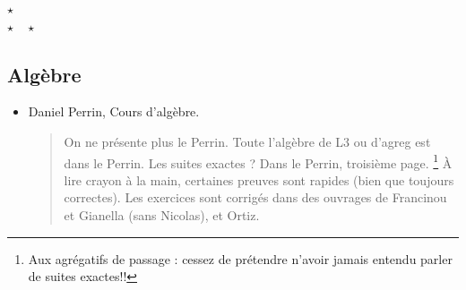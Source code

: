 \documentclass{article}
\def\separateur{\begin{center}
$\star$\\
$\star\quad\star$
\end{center}}
\begin{document}
\separateur
\subsection{Algèbre}
\begin{mdframed}
\begin{itemize}
\item Daniel Perrin, Cours d'algèbre.
\begin{quote}
On ne présente plus \og le Perrin\fg. Toute l'algèbre de L3 ou d'agreg est \og dans le Perrin\fg. Les suites exactes ? Dans le Perrin, troisième page.%
\footnote{Aux agrégatifs de passage : cessez de prétendre n'avoir jamais entendu parler de suites exactes!!}
 À lire crayon à la main, certaines preuves sont rapides (bien que toujours correctes). Les exercices sont corrigés dans des ouvrages de Francinou et Gianella (sans Nicolas), et Ortiz.
\end{quote}
\end{itemize}
\end{mdframed}
\end{document}
